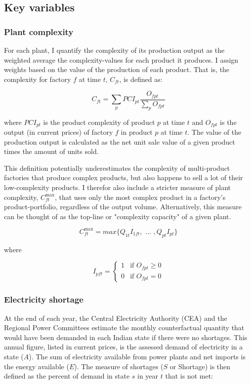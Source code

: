 \documentclass[11pt]{article}
\begin{document}
\subsection{Key variables}%
\label{sub:key_variables}

\subsubsection{Plant complexity}%
\label{sub:plant_complexity}

For each plant, I quantify the complexity of its production output as the weighted average the complexity-values for each product it produces. I assign weights based on the value of the production of each product. That is, the complexity for factory \(f\) at time \(t\), \(C_{ft}\), is defined as:

\[
C_{ft} = \sum_p PCI_{pt} \frac{O_{fpt}}{\sum_p O_{fpt}}
\] 

where \(PCI_{pt}\) is the product complexity of product \(p\) at time \(t\) and \(O_{fpt}\) is the output (in current prices) of factory \(f\) in product \(p\) at time \(t\). The value of the production output is calculated as the net unit sale value of a given product times the amount of units sold. 

This definition potentially underestimates the complexity of multi-product factories that produce complex products, but also happens to sell a lot of their low-complexity products. I therefor also include a stricter measure of plant complexity, \(C^{\text{max}}_{ft}\), that uses only the most complex product in a factory's product-portfolio, regardless of the output volume. Alternatively, this measure can be thought of as the top-line or "complexity capacity" of a given plant. 

\[
C^{\text{max}}_{ft} = max \{ Q_{1t} I_{1ft}, \text{ ... }, Q_{pt} I_{pt} \}
\]

where

\[
I_{pft} = \begin{cases}
 1 & \text{if } O_{fpt} \geq 0 \\
 0 & \text{if } O_{fpt} = 0
\end{cases}
\]

\subsubsection{Electricity shortage}%
\label{sub:shortage}

At the end of each year, the Central Electricity Authority (CEA) and the Regional Power Committees estimate the monthly counterfactual quantity that would have been demanded in each Indian state if there were no shortages. This annual figure, listed in current prices, is the assessed demand of electricity in a state (\(A\)). The sum of electricity available from power plants and net imports is the energy available ($E$). The measure of shortages (\(S\) or Shortage) is then defined as the percent of demand in state \(s\) in year \(t\) that is not met:
\end{document}
